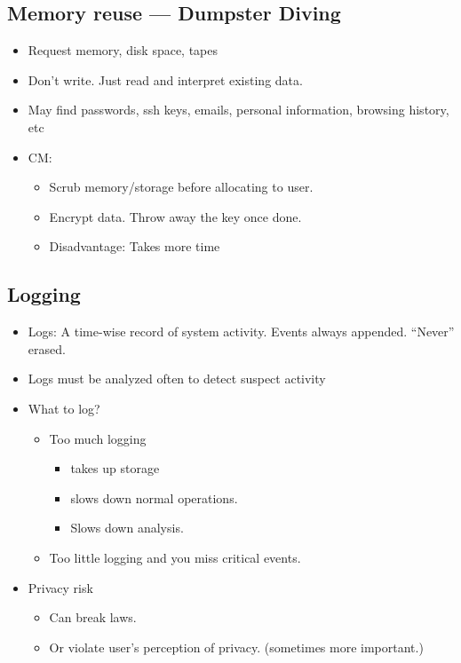 \documentclass[12pt]{article}
\begin{document}
\subsection{Memory reuse — Dumpster Diving}
\begin{itemize}
    \item Request memory, disk space, tapes
    \item Don't write. Just read and interpret existing data.
    \item May find passwords, ssh keys, emails, personal information, browsing history, etc
    \item CM: \begin{itemize}
        \item Scrub memory/storage before allocating to user. 
        \item Encrypt data. Throw away the key once done.
        \item Disadvantage: Takes more time
    \end{itemize}
\end{itemize}
\subsection{Logging}
\begin{itemize}
    \item Logs: A time-wise record of system activity. Events always appended. “Never” erased.
    \item Logs must be analyzed often to detect suspect activity
    \item What to log? \begin{itemize}
        \item Too much logging \begin{itemize}
            \item takes up storage
            \item slows down normal operations. 
            \item Slows down analysis.
        \end{itemize}
        \item Too little logging and you miss critical events.
    \end{itemize}
    \item Privacy risk \begin{itemize}
        \item Can break laws. 
        \item Or violate user's perception of privacy. (sometimes more important.)
    \end{itemize}
\end{itemize}
\end{document}
